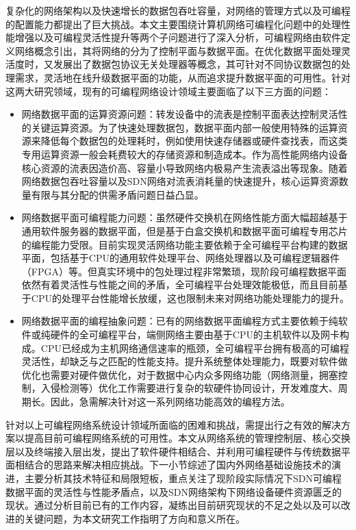 复杂化的网络架构以及快速增长的数据包吞吐容量，对网络的管理方式以及可编程的配置能力都提出了巨大挑战。本文主要围绕计算机网络可编程化问题中的处理性能增强以及可编程灵活性提升等两个子问题进行了深入分析，可编程网络由软件定义网络概念引出，其将网络的分为了控制平面与数据平面。在优化数据平面处理灵活度时，又发展出了数据包协议无关处理器等概念，其可针对不同协议数据包的处理需求，灵活地在线升级数据平面的功能，从而追求提升数据平面的可用性。针对这两大研究领域，现有的可编程网络设计领域主要面临了以下三方面的问题：


\begin{itemize}
	\item {\hei 网络数据平面的运算资源问题}：转发设备中的流表是控制平面表达控制灵活性的关键运算资源。为了快速处理数据包，数据平面内部一般使用特殊的运算资源来降低每个数据包的处理耗时，例如使用快速存储器或硬件查找表，而这类专用运算资源一般会耗费较大的存储资源和制造成本。作为高性能网络内设备核心资源的流表因造价高、容量小导致网络内极易产生流表溢出等现象。随着网络数据包吞吐容量以及SDN网络对流表消耗量的快速提升，核心运算资源数量有限与其分配的供需矛盾问题日益凸显。
	
	
	\item {\hei 网络数据平面可编程能力问题}：虽然硬件交换机在网络性能方面大幅超越基于通用软件服务器的数据平面，但是基于白盒交换机和数据平面可编程专用芯片的编程能力受限。目前实现灵活网络功能主要依赖于全可编程平台构建的数据平面，包括基于CPU的通用软件处理平台、网络处理器以及可编程逻辑器件（FPGA）等。但真实环境中的包处理过程非常繁琐，现阶段可编程数据平面依然有着灵活性与性能之间的矛盾，全可编程平台处理效能极低，而且目前基于CPU的处理平台性能增长放缓，这也限制未来对网络功能处理能力的提升。
	
	\item {\hei 网络数据平面的编程抽象问题}：已有的网络数据平面编程方式主要依赖于纯软件或纯硬件的全可编程平台，端侧网络主要由基于CPU的主机软件以及网卡构成。CPU已经成为主机网络通信速率的瓶颈，全可编程平台拥有极高的可编程灵活性，却缺乏与之匹配的性能支持。提升系统整体处理能力，既要对软件做优化也需要对硬件做优化，对于数据中心内众多网络功能（网络测量，拥塞控制，入侵检测等）优化工作需要进行复杂的软硬件协同设计，开发难度大、周期长。因此，急需解决针对这一系列网络功能高效的编程方法。
\end{itemize}

针对以上可编程网络系统设计领域所面临的困难和挑战，需提出行之有效的解决方案以提高目前可编程网络系统的可用性。本文从网络系统的管理控制层、核心交换层以及终端接入层出发，提出了软件硬件相结合、并利用可编程硬件与传统数据平面相结合的思路来解决相应挑战。下一小节综述了国内外网络基础设施技术的演进，主要分析其技术特征和局限短板，重点关注了现阶段实际情况下SDN可编程数据平面的灵活性与性能矛盾点，以及SDN网络架构下网络设备硬件资源匮乏的现状。通过分析目前已有的工作内容，凝练出目前研究现状的不足之处以及可以改进的关键问题，为本文研究工作指明了方向和意义所在。










